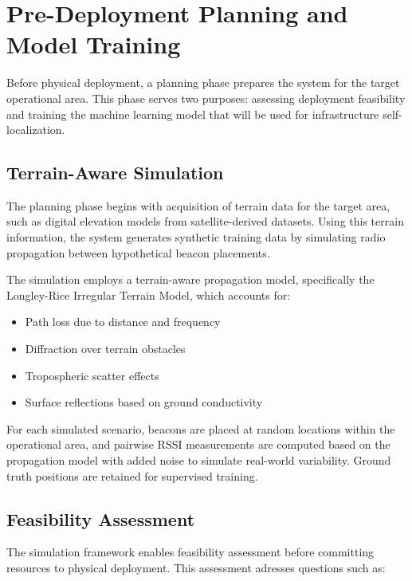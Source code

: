 \documentclass[master,final,11pt]{iscs-thesis}
\begin{document}
\section{Pre-Deployment Planning and Model Training}
\label{sec:predeployment}

Before physical deployment, a planning phase prepares the system for the target operational area.
This phase serves two purposes: assessing deployment feasibility and training the machine learning model that will be used for infrastructure self-localization.

\subsection{Terrain-Aware Simulation}

The planning phase begins with acquisition of terrain data for the target area, such as digital elevation models from satellite-derived datasets.
Using this terrain information, the system generates synthetic training data by simulating radio propagation between hypothetical beacon placements.

The simulation employs a terrain-aware propagation model, specifically the Longley-Rice Irregular Terrain Model, which accounts for:
\begin{itemize}
    \item Path loss due to distance and frequency
    \item Diffraction over terrain obstacles
    \item Tropospheric scatter effects
    \item Surface reflections based on ground conductivity
\end{itemize}

For each simulated scenario, beacons are placed at random locations within the operational area, and pairwise RSSI measurements are computed based on the propagation model with added noise to simulate real-world variability.
Ground truth positions are retained for supervised training.

\subsection{Feasibility Assessment}

The simulation framework enables feasibility assessment before committing resources to physical deployment.
This assessment adresses questions such as:
\end{document}
